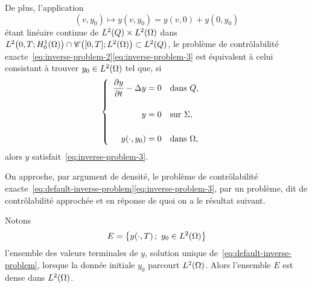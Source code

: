 \begin{remarque}%
    De plus, l'application
    \begin{equation}
        \left({v,y_{0}}\right)\longmapsto y\!\left({v,y_{0}}\right) =
        y(v,0) + y\!\left({0,y_{0}}\right)
    \end{equation}
    étant linéaire continue de $L^{2}\!\left({Q}\right)\times L^{2}\!\left({\Omega}\right)$ dans
    $\Ldeux{0,T;H_{0}^{1}(\Omega)}\cap \Cscr\!\left({%
        [0,T];\Ldeux{\Omega}
    }\right)\subset\Ldeux{Q}$, le problème de contrôlabilité
    exacte~\eqref{eq:inverse-problem-2}\eqref{eq:inverse-problem-3} est
    équivalent à celui consistant à trouver $y_{0}\in L^{2}\!\left({\Omega}\right)$ tel
    que, si
    \begin{equation}\label{eq:default-inverse-problem}
        \begin{cases}\displaystyle
            \begin{array}{rl}
                \dfrac{\partial{}y}{\partial{}t} - \Delta y = 0 & \text{dans}\ Q,\\
                \\
                y = 0 & \text{sur}\ \Sigma,\\
                \\
                y\!\left({\cdot,y_{0}}\right) = 0 & \text{dans}\ \Omega,
            \end{array}
        \end{cases}
    \end{equation}
    alors $y$ satisfait~\eqref{eq:inverse-problem-3}.
\end{remarque}

On approche, par argument de densité, le problème de contrôlabilité
exacte~\eqref{eq:default-inverse-problem}\eqref{eq:inverse-problem-3}, par
un problème, dit de contrôlabilité approchée et en réponse de quoi on a le
résultat suivant.

\begin{proposition}\label{propo:controllability-result-1}%
    Notons
    \begin{equation}\label{eq:controllability-result-1}
        E = \left\{{%
            y(\cdot,T)\,;\ y_{0}\in\Ldeux{\Omega}
        }\right\}
    \end{equation}
    l'ensemble des valeurs terminales de $y$, solution unique
    de~\eqref{eq:default-inverse-problem}, lorsque la donnée initiale
    $y_{0}$ parcourt $L^{2}\!\left({\Omega}\right)$. Alors l'ensemble $E$ est dense dans
    $L^{2}\!\left({\Omega}\right)$.
\end{proposition}

